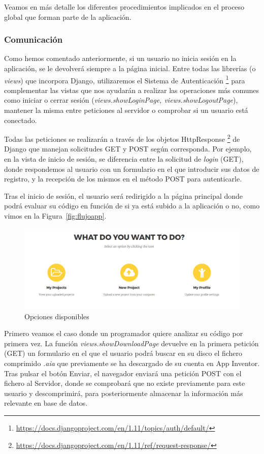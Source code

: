 \documentclass[a4paper, 12pt]{book}
\begin{document}
Veamos en más detalle los diferentes procedimientos implicados en el proceso global que forman parte de la aplicación.
\subsubsection{Comunicación}
Como hemos comentado anteriormente, si un usuario no inicia sesión en la aplicación, se le devolverá siempre a la página inicial. Entre todas las librerías (o \textit{views}) que incorpora Django, utilizaremos el Sistema de Autenticación \footnote{\url{https://docs.djangoproject.com/en/1.11/topics/auth/default/}} para complementar las vistas que nos ayudarán a realizar las operaciones más comunes como iniciar o cerrar sesión (\textit{views.showLoginPage, views.showLogoutPage}), mantener la misma entre peticiones al servidor o comprobar si un usuario está conectado. 

Todas las peticiones se realizarán a través de los objetos HttpResponse \footnote{\url{https://docs.djangoproject.com/en/1.11/ref/request-response/}} de Django que manejan solicitudes GET y POST según corresponda. Por ejemplo, en la vista de inicio de sesión, se diferencia entre la solicitud de \textit{login} (GET), donde respondemos al usuario con un formulario en el que introducir sus datos de registro, y la recepción de los mismos en el método POST para autenticarle. 

Tras el inicio de sesión, el usuario será redirigido a la página principal donde podrá evaluar su código en función de si ya está subido a la aplicación o no, como vimos en la Figura~\ref{fig:flujoapp}. 

\begin{figure}[H]
  \centering
  \includegraphics[width=\linewidth, keepaspectratio]{img/usercontent}
  \caption{Opciones disponibles}
  \label{fig:usercontent}
\end{figure}

Primero veamos el caso donde un programador quiere analizar su código por primera vez. La función \textit{views.showDownloadPage} devuelve en la primera petición (GET) un formulario en el que el usuario podrá buscar en su disco el fichero comprimido \textit{.aia} que previamente se ha descargado de su cuenta en App Inventor. Tras pulsar el botón Enviar, el navegador enviará una petición POST con el fichero al Servidor, donde se comprobará que no existe previamente para este usuario y descomprimirá, para posteriormente almacenar la información más relevante en base de datos. 
\end{document}
